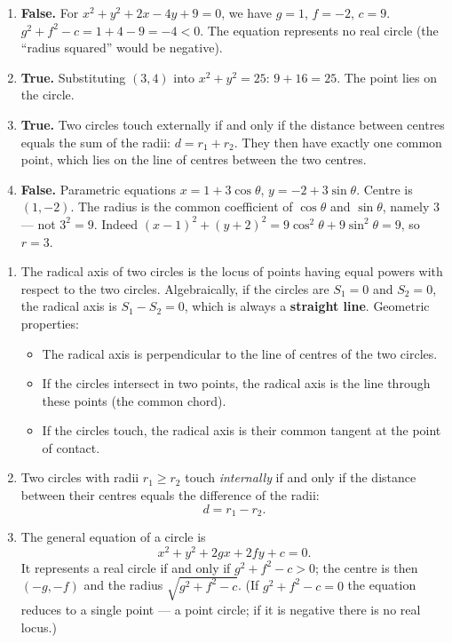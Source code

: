\documentclass[11pt]{article}
\newcommand{\cle}[1]{{\popxbold\color{popdark}#1}}
\begin{document}
\begin{corrige}
\begin{enumerate}
\item \textbf{False.} For $x^2+y^2+2x-4y+9=0$, we have $g=1$, $f=-2$, $c=9$.
$g^2+f^2-c = 1+4-9 = -4 < 0$. The equation represents no real circle (the ``radius squared'' would be negative).
\item \textbf{True.} Substituting $(3,4)$ into $x^2+y^2=25$: $9+16=25$. The point lies on the circle.
\item \textbf{True.} Two circles touch externally if and only if the distance between centres equals the sum of the radii: $d = r_1 + r_2$. They then have exactly one common point, which lies on the line of centres between the two centres.
\item \textbf{False.} Parametric equations $x = 1 + 3\cos\theta$, $y = -2 + 3\sin\theta$.
Centre is $(1, -2)$. The radius is the common coefficient of $\cos\theta$ and $\sin\theta$, namely $3$ — not $3^2=9$.
Indeed $(x-1)^2+(y+2)^2 = 9\cos^2\theta+9\sin^2\theta = 9$, so $r=3$.
\end{enumerate}
\end{corrige}

\begin{corrige}
\begin{enumerate}
\item The \cle{radical axis} of two circles is the locus of points having equal powers with respect to the two circles. Algebraically, if the circles are $S_1=0$ and $S_2=0$, the radical axis is $S_1 - S_2 = 0$, which is always a \textbf{straight line}.
Geometric properties:
\begin{itemize}
\item The radical axis is perpendicular to the line of centres of the two circles.
\item If the circles intersect in two points, the radical axis is the line through these points (the common chord).
\item If the circles touch, the radical axis is their common tangent at the point of contact.
\end{itemize}
\item Two circles with radii $r_1 \ge r_2$ touch \emph{internally} if and only if the distance between their centres equals the difference of the radii:
\[ d = r_1 - r_2. \]
\item The general equation of a circle is
\[ x^2 + y^2 + 2gx + 2fy + c = 0. \]
It represents a real circle if and only if $g^2 + f^2 - c > 0$; the centre is then $(-g, -f)$ and the radius $\sqrt{g^2 + f^2 - c}$.
(If $g^2+f^2-c = 0$ the equation reduces to a single point — a point circle; if it is negative there is no real locus.)
\end{enumerate}
\end{corrige}
\end{document}
